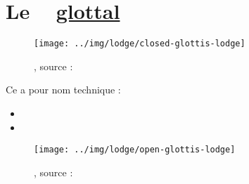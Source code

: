 \newpage

\section{Le \son~  \href{https://en.wikipedia.org/wiki/Glottal\_stop}{glottal}
  }\label{sec:glottal}

\begin{center}
  \begin{figure}[h]
    \centering
    \texttt{[image: ../img/lodge/closed-glottis-lodge]}
    \caption{, source :~\cite{lodge}}
    \label{fig:clos-glot}
  \end{figure}
\end{center}

  Ce \son a pour nom technique :%
  \begin{itemize}%
  \item {}%
  \item {}%
  \end{itemize}

\begin{center}
  \begin{figure}[h]
    \centering
    \texttt{[image: ../img/lodge/open-glottis-lodge]}
    \caption{, source :~\cite{lodge}}
    \label{fig:open-glot}
  \end{figure}
\end{center}

  \indicsound
  

